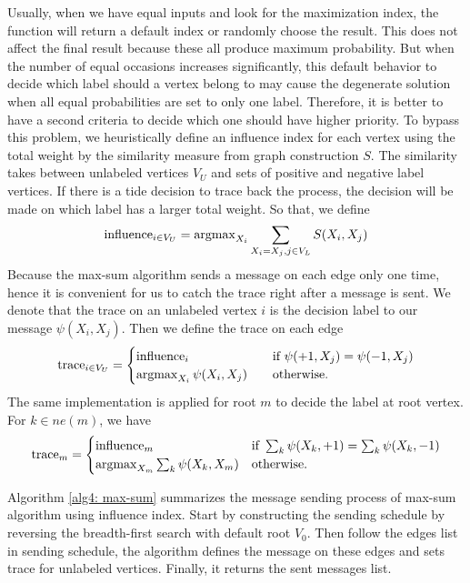 Usually, when we have equal inputs and look for the maximization index, the function will return a default index or randomly choose the result. This does not affect the final result because these all produce maximum probability. But when the number of equal occasions increases significantly, this default behavior to decide which label should a vertex belong to may cause the degenerate solution when all equal probabilities are set to only one label. Therefore, it is better to have a second criteria to decide which one should have higher priority. To bypass this problem,  we heuristically define an influence index for each vertex using the total weight by the similarity measure from graph construction $S$. The similarity takes between unlabeled vertices $V_U$ and sets of positive and negative label vertices. If there is a tide decision to trace back the process, the decision will be made on which label has a larger total weight. So that, we define
\begin{align}
	\textnormal{influence}_{i \in V_U} = \operatorname{argmax}_{X_i}{ \sum_{X_i = X_j, j \in V_L}{S(X_i, X_j)} }
\end{align}
Because the max-sum algorithm sends a message on each edge only one time, hence it is convenient for us to catch the trace right after a message is sent. We denote that the trace on an unlabeled vertex $i$ is the decision label to our message $\psi(X_i, X_j)$. Then we define the trace on each edge
\begin{align}
	\textnormal{trace}_{i \in V_U} = 
	\begin{cases}
	\textnormal{influence}_{i} &\quad \text{if } \psi(+1, X_j) = \psi(-1, X_j)\\
	\operatorname{argmax}_{X_i}{\psi(X_i, X_j)} &\quad \text{otherwise.}
	\end{cases}
\end{align}
The same implementation is applied for root $m$ to decide the label at root vertex. For $k\in ne(m)$, we have
\begin{align}
	\textnormal{trace}_{m} = 
	\begin{cases}
	\textnormal{influence}_{m} & \text{if } \sum_{k}{\psi(X_k, +1)} = \sum_{k}{\psi(X_k, -1)}\\
	\operatorname{argmax}_{X_m}{\sum_{k}{\psi(X_k, X_m)}} & \text{otherwise.}
	\end{cases}
	\label{equal4: trace at root}
\end{align}

Algorithm \ref{alg4: max-sum} summarizes the message sending process of max-sum algorithm using influence index. Start by constructing the sending schedule by reversing the breadth-first search with default root $V_0$. Then follow the edges list in sending schedule, the algorithm defines the message on these edges and sets trace for unlabeled vertices. Finally, it returns the sent messages list.

